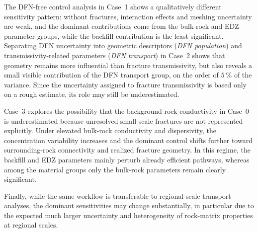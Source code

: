 The DFN-free control analysis in Case~1 shows a qualitatively different
sensitivity pattern: without fractures, interaction effects and meshing
uncertainty are weak, and the dominant contributions come from the bulk-rock
and EDZ parameter groups, while the backfill contribution is the least
significant. Separating DFN uncertainty into geometric descriptors
(\emph{DFN population}) and transmissivity-related parameters
(\emph{DFN transport}) in Case~2 shows that geometry remains more influential
than fracture transmissivity, but also reveals a small visible contribution of
the DFN transport group, on the order of $5~\%$ of the variance. Since the
uncertainty assigned to fracture transmissivity is based only on a rough
estimate, its role may still be underestimated.

Case~3 explores the possibility that the background rock conductivity in
Case~0 is underestimated because unresolved small-scale fractures are not
represented explicitly. Under elevated bulk-rock conductivity and dispersivity,
the concentration variability increases and the dominant control shifts further
toward surrounding-rock connectivity and realized fracture geometry. In this
regime, the backfill and EDZ parameters mainly perturb already efficient
pathways, whereas among the material groups only the bulk-rock parameters
remain clearly significant.

Finally, while the same workflow is transferable to regional-scale transport
analyses, the dominant sensitivities may change substantially, in particular
due to the expected much larger uncertainty and heterogeneity of rock-matrix
properties at regional scales.
